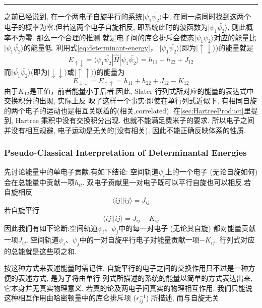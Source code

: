 \documentclass[fontset=none,12pt,a4paper]{ctexart}
\numberwithin{equation}{section}
\begin{document}
\noindent\rule{\linewidth}{0.4pt}
\vspace{1em}
之前已经说到, 在一个两电子自旋平行的系统$|\bar{\psi_1}\bar{\psi_2}\rangle$中, 
在同一点同时找到这两个电子的概率为零.但若这两个电子自旋相反,
即系统此时的波函数为$|\psi_1\bar{\psi_2}\rangle$, 则此概率不为零. 那么一个合理的推测
就是电子间的库仑排斥会使态$|\bar{\psi_1}\bar{\psi_2}\rangle$对应的能量比
$|\psi_1\bar{\psi_2}\rangle$的能量低. 利用式\eqref{eq:determinant-energy}，
$|\psi_1\bar{\psi_2}\rangle$(即为$|\uparrow\downarrow\rangle$)的能量就是
\begin{equation}
  E_{\uparrow\downarrow}=\langle\psi_1\bar{\psi_2}|\hat{H}|\psi_1\bar{\psi_2}\rangle
=h_{11}+h_{22}+J_{12}
\end{equation}
而$|\bar{\psi_1}\bar{\psi_2}\rangle$(即为$|\downarrow\downarrow\rangle$或$|\uparrow\uparrow\rangle$)的能量为
\begin{equation}
  E_{\downarrow\downarrow}=E_{\uparrow\uparrow}
=h_{11}+h_{22}+J_{12}-K_{12}
\end{equation}
由于$K_{12}$是正值，前者能量小于后者.因此, Slater 行列式所对应的能量的表达式中交换积分的出现,
 实际上反 映了这样一个事实:即使在单行列式近似下, 有相同自旋的两个电子的运动也是相互关联着的(相关,correlated).
 在\ref{sec:HartreeProduct}里提到, 
 Hartree 乘积中没有交换积分出现. 也就不能满足费米子的要求. 
 所以电子之间并没有相互规避, 电子运动是无关的(没有相关), 因此不能正确反映体系的性质.
\subsubsection{Pseudo-Classical Interpretation of Determinantal Energies}
先讨论能量中的单电子贡献.有如下结论: 空间轨道$\psi_i$上的一个电子 (无论自旋如何) 会在总能量中贡献一项$h_{ii}$.
双电子贡献里一对电子既可以平行自旋也可以相反.若自旋相反
\begin{equation}
  \langle ij||ij\rangle=J_{ij}
\end{equation}
若自旋平行
\begin{equation}
  \langle ij||ij\rangle=J_{ij}-K_{ij}
\end{equation}
因此我们有如下论断:空间轨道$\psi_i$、$\psi_j$中的每一对电子 (无论其自旋) 都对能量贡献一项$J_{ij}$.
空间轨道$\psi_i$、$\psi_j$中的一对自旋平行电子对能量贡献一项$-K_{ij}$. 行列式对应的总能就是这些项之和.

按这种方式来表述能量时需记住, 自旋平行的电子之间的交换作用只不过是一种方便的表述方式,
是为了将由单行 列式所描述的系统的能量以简单的方式表达出来, 它本身并无真实物理意义.
若真的论及两电子间真实的物理相互作用, 我们只能说这种相互作用由哈密顿量中的库仑排斥项 ($r_{ij}^{-1}$) 所描述,
而与自旋无关.
\end{document}
